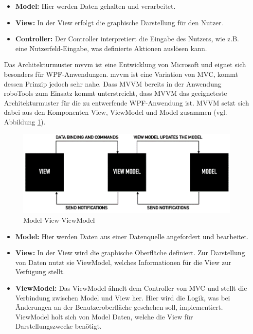 \documentclass[ a4paper,
                oneside,
                toc=bibliography,
                toc=listof
                ]{scrbook}
\begin{document}
	\begin{itemize}
		\item \textbf{Model: }Hier werden Daten gehalten und verarbeitet.
		\item \textbf{View: } In der View erfolgt die graphische Darstellung für den Nutzer.
		\item \textbf{Controller: } Der Controller interpretiert die Eingabe des Nutzers, wie z.B. eine Nutzerfeld-Eingabe, was definierte Aktionen auslösen kann.
	\end{itemize}
	Das Architekturmuster \acs{mvvm} ist eine Entwicklung von Microsoft und eignet sich besonders für WPF-Anwendungen. \ac{mvvm} ist eine Variation von MVC, kommt dessen Prinzip jedoch sehr nahe. \cite{MVVMKraus} \cite{kotz2022c} \cite{troelsen2022pro}
	Dass MVVM bereits in der Anwendung roboTools zum Einsatz kommt unterstreicht, dass MVVM das geeigneteste Architekturmuster für die zu entwerfende WPF-Anwendung ist. MVVM setzt sich dabei aus den Komponenten View, ViewModel und Model zusammen (vgl. Abbildung \ref{fig:MVVM}).\\
	\begin{figure}[!h]
		\centering
		\includegraphics[width=0.7\linewidth]{./images/MVV.png}
		\caption{Model-View-ViewModel \cite{mvvm}}
		\label{fig:MVVM}
	\end{figure}
	\begin{itemize}
		\item \textbf{Model: } Hier werden Daten aus einer Datenquelle angefordert und bearbeitet.
		\item \textbf{View: } In der View wird die graphische Oberfläche definiert. Zur Darstellung von Daten nutzt sie ViewModel, welches Informationen für die View zur Verfügung stellt.
		\item \textbf{ViewModel: } Das ViewModel ähnelt dem Controller von MVC und stellt die Verbindung zwischen Model und View her. Hier wird die Logik, was bei Änderungen an der Benutzeroberfläche geschehen soll, implementiert. ViewModel holt sich von Model Daten, welche die View für Darstellungszwecke benötigt. \cite{MVVMKraus} \cite{troelsen2022pro}
	\end{itemize}
\end{document}
